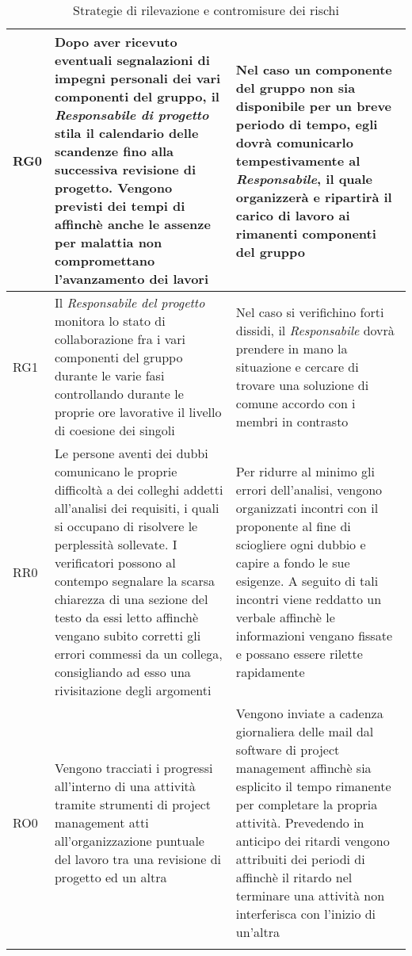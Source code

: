 \documentclass[../PianodiProgetto.tex]{subfiles}
\begin{document}
\begin{longtable}{|p{15mm}|p{60mm}|p{60mm}|}
			 RG0& Dopo aver ricevuto eventuali segnalazioni di impegni personali dei vari componenti del gruppo, il \textit{Responsabile di progetto} stila il calendario delle scandenze fino alla successiva revisione di progetto. Vengono previsti dei tempi di \glossario{slack}{Slack} affinchè anche le assenze per malattia non compromettano l'avanzamento dei lavori & Nel caso un componente del gruppo non sia disponibile per un breve periodo di tempo, egli dovrà comunicarlo tempestivamente al \textit{Responsabile}, il quale organizzerà e ripartirà il carico di lavoro ai rimanenti componenti del gruppo\\ \hline
			 RG1& Il \textit{Responsabile del progetto} monitora lo stato di collaborazione fra i vari componenti del gruppo durante le varie fasi controllando durante le proprie ore lavorative il livello di coesione dei singoli & Nel caso si verifichino forti dissidi, il \textit{Responsabile} dovrà prendere in mano la situazione e cercare di trovare una soluzione di comune accordo con i membri in contrasto\\ \hline
			  \newpage
			 \hline RR0& Le persone aventi dei dubbi comunicano le proprie difficoltà a dei colleghi addetti all'analisi dei requisiti, i quali si occupano di risolvere le perplessità sollevate. I verificatori possono al contempo segnalare la scarsa chiarezza di una sezione del testo da essi letto affinchè vengano subito corretti gli errori commessi da un collega, consigliando ad esso una rivisitazione degli argomenti & Per ridurre al minimo gli errori dell'analisi, vengono organizzati incontri con il proponente al fine di sciogliere ogni dubbio e capire a fondo le sue esigenze. A seguito di tali incontri viene reddatto un verbale affinchè le informazioni vengano fissate e possano essere rilette rapidamente\\ \hline
			 RO0& Vengono tracciati i progressi all'interno di una attività tramite strumenti di project management atti all'organizzazione puntuale del lavoro tra una revisione di progetto ed un altra & Vengono inviate a cadenza giornaliera delle mail dal software di project management affinchè sia esplicito il tempo rimanente per completare la propria attività. Prevedendo in anticipo dei ritardi vengono attribuiti dei periodi di \glossario{slack}{Slack} affinchè il ritardo nel terminare una attività non interferisca con l'inizio di un'altra\\ \hline
			 \caption{Strategie di rilevazione e contromisure dei rischi}
		\end{longtable}
\end{document}
